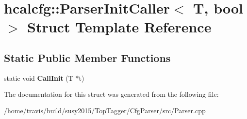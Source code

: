 \hypertarget{structhcalcfg_1_1ParserInitCaller}{\section{hcalcfg\-:\-:Parser\-Init\-Caller$<$ T, bool $>$ Struct Template Reference}
\label{structhcalcfg_1_1ParserInitCaller}
}
\subsection*{Static Public Member Functions}
\begin{DoxyCompactItemize}
\item 
\hypertarget{structhcalcfg_1_1ParserInitCaller_acf35f0c5780c9b92f444a4ffec906629}{static void {\bfseries Call\-Init} (T $\ast$t)}\label{structhcalcfg_1_1ParserInitCaller_acf35f0c5780c9b92f444a4ffec906629}

\end{DoxyCompactItemize}


The documentation for this struct was generated from the following file\-:\begin{DoxyCompactItemize}
\item 
/home/travis/build/susy2015/\-Top\-Tagger/\-Cfg\-Parser/src/Parser.\-cpp\end{DoxyCompactItemize}
